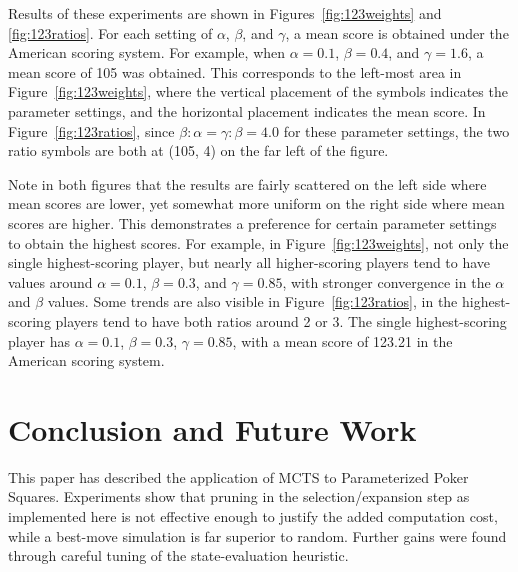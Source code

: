 \documentclass[letterpaper]{article}
\begin{document}
Results of these experiments are shown in Figures~\ref{fig:123weights} and \ref{fig:123ratios}. For each setting of $\alpha$, $\beta$, and $\gamma$, a mean score is obtained under the American scoring system. For example, when $\alpha = 0.1$, $\beta = 0.4$, and $\gamma = 1.6$, a mean score of 105 was obtained. This corresponds to the left-most area in Figure~\ref{fig:123weights}, where the vertical placement of the symbols indicates the parameter settings, and the horizontal placement indicates the mean score. In Figure~\ref{fig:123ratios}, since $\beta:\alpha = \gamma:\beta = 4.0$ for these parameter settings, the two ratio symbols are both at (105, 4) on the far left of the figure.

Note in both figures that the results are fairly scattered on the left side where mean scores are lower, yet somewhat more uniform on the right side where mean scores are higher. This demonstrates a preference for certain parameter settings to obtain the highest scores. For example, in Figure~\ref{fig:123weights}, not only the single highest-scoring player, but nearly all higher-scoring players tend to have values around $\alpha = 0.1$, $\beta = 0.3$, and $\gamma = 0.85$, with stronger convergence in the $\alpha$ and $\beta$ values. Some trends are also visible in Figure~\ref{fig:123ratios}, in the highest-scoring players tend to have both ratios around 2 or 3. The single highest-scoring player has $\alpha = 0.1$, $\beta = 0.3$, $\gamma = 0.85$, with a mean score of 123.21 in the American scoring system.




\section{Conclusion and Future Work}

This paper has described the application of MCTS to Parameterized Poker Squares. Experiments show that pruning in the selection/expansion step as implemented here is not effective enough to justify the added computation cost, while a best-move simulation is far superior to random. Further gains were found through careful tuning of the state-evaluation heuristic.
\end{document}

